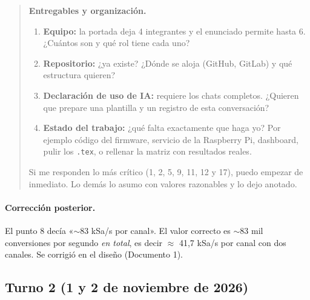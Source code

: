 \documentclass[12pt,a4paper]{article}
\begin{document}
\begin{quote}
\textbf{Entregables y organización.}
\begin{enumerate}[leftmargin=*, start=14]
\item \textbf{Equipo:} la portada deja 4 integrantes y el enunciado permite hasta 6. ¿Cuántos son y qué rol tiene cada uno?
\item \textbf{Repositorio:} ¿ya existe? ¿Dónde se aloja (GitHub, GitLab) y qué estructura quieren?
\item \textbf{Declaración de uso de IA:} requiere los chats completos. ¿Quieren que prepare una plantilla y un registro de esta conversación?
\item \textbf{Estado del trabajo:} ¿qué falta exactamente que haga yo? Por ejemplo código del firmware, servicio de la Raspberry Pi, dashboard, pulir los \texttt{.tex}, o rellenar la matriz con resultados reales.
\end{enumerate}

Si me responden lo más crítico (1, 2, 5, 9, 11, 12 y 17), puedo empezar de inmediato. Lo demás lo asumo con valores razonables y lo dejo anotado.
\end{quote}

\paragraph{Corrección posterior.} El punto 8 decía «$\sim$83 kSa/s por canal». El valor correcto es $\sim$83 mil conversiones por segundo \emph{en total}, es decir $\approx$ 41,7 kSa/s por canal con dos canales. Se corrigió en el diseño (Documento 1).

\subsection{Turno 2 (1 y 2 de noviembre de 2026)}
\end{document}
